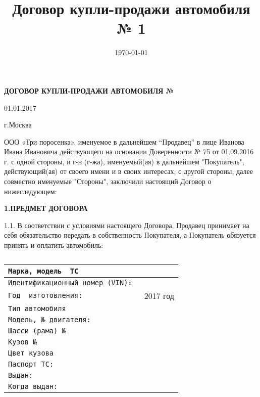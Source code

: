 \documentclass[a4paper,12pt]{article}
\title{Договор купли-продажи автомобиля № 1}
\date{\today}
\begin{document}

  \begin{center}
 \vspace{1 ex}
 \textbf{ДОГОВОР КУПЛИ-ПРОДАЖИ АВТОМОБИЛЯ № }
 \vspace{1ex}
    \end{center}
    
    \begin{flushright}01.01.2017\end{flushright}   \begin{flushleft}г.Москва\end{flushleft} 

 ООО «Три поросенка», именуемое в дальнейшем “Продавец”  в лице Иванова Ивана Ивановича действующего на основании  Доверенности № 75 от 01.09.2016 г. с  одной  стороны, и  г-н (г-жа), именуемый(ая) в дальнейшем "Покупатель", действующий(ая) от своего имени и в своих интересах, с другой стороны, далее совместно именуемые "Стороны", заключили настоящий Договор о нижеследующем:

\begin{center}
 \vspace{1 ex}
 \textbf{1.ПРЕДМЕТ ДОГОВОРА}
 \vspace{1ex}
    \end{center}
1.1. В соответствии с условиями настоящего Договора, Продавец принимает на себя обязательство передать в собственность Покупателя, а Покупатель обязуется принять и оплатить автомобиль: 

\begin{table}[h!]
 \caption{}
 \centering
  \begin{tabular}{|c|c|}
  \hline \verb|Марка, модель  ТС              | & \normalsize          \\
  \hline \verb|Идентификационный номер (VIN): | & \normalsize          \\
  \hline \verb|Год  изготовления:             | & \normalsize 2017 год \\
  \hline \verb|Тип автомобиля                 | &  \normalsize         \\
  \hline \verb|Модель, № двигателя:           | &  \normalsize         \\
  \hline \verb|Шасси (рама) №                 | &  \normalsize         \\
  \hline \verb|Кузов №                        | &  \normalsize         \\
  \hline \verb|Цвет кузова                    | &  \normalsize         \\
  \hline \verb|Паспорт ТС:                    | &  \normalsize         \\  
  \hline \verb|Выдан:                         | &  \normalsize         \\
  \hline \verb|Когда выдан:                   | &  \normalsize         \\
  \hline
  \end{tabular}
\end{table}
\end{document}
